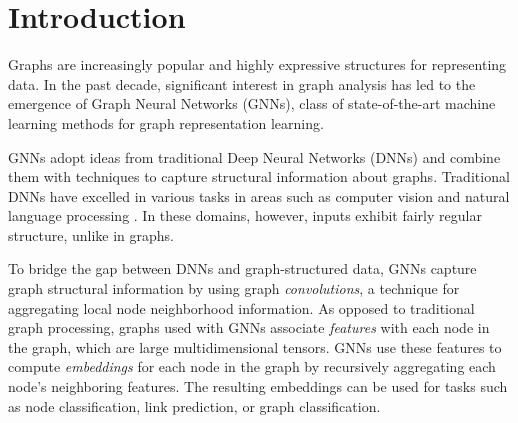 \chapter{Introduction}


Graphs are increasingly popular and highly expressive structures for representing data.
In the past decade, significant interest in graph analysis has led to the emergence of Graph Neural Networks (GNNs), class of state-of-the-art machine learning methods for graph representation learning. 

GNNs adopt ideas from traditional Deep Neural Networks (DNNs) and combine them with techniques to capture structural information about graphs. Traditional DNNs have excelled in various tasks in areas such as computer vision \cite{AlexNet_2012}\cite{YOLO_2016} and natural language processing \cite{RNN_2013}\cite{NamedEntityRecognition_2016}. In these domains, however, inputs exhibit fairly regular structure, unlike in graphs. 

To bridge the gap between DNNs and graph-structured data, GNNs capture graph structural information by using graph \textit{convolutions}, a technique for aggregating local node neighborhood information. As opposed to traditional graph processing, graphs used with GNNs associate \textit{features} with each node in the graph, which are large multidimensional tensors. GNNs use these features to compute \textit{embeddings} for each node in the graph by recursively aggregating each node's neighboring features. 
The resulting embeddings can be used for tasks such as node classification, link prediction, or graph classification.




